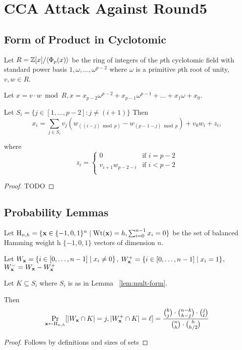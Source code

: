 \section{CCA Attack Against Round5}
\label{sec:cca-attack-against}

\subsection{Form of Product in Cyclotomic}
\label{sec:form-prod-cycl}



\begin{lemma}
\label{lem:mult-form}
Let $R=\mathbb{Z}[x]/\langle\Phi_{p}(x)\rangle$ be the ring of integers of the $p$th cyclotomic field with standard power basis $1,\omega,\ldots,\omega^{p-2}$ where $\omega$ is a primitive $p$th root of unity, $v, w \in R$.

Let $x=v \cdot w \bmod{R}, x=x_{p-2}\omega^{p-2}+x_{p-1}\omega^{p-1}+\ldots+x_{1}\omega+x_{0}$. 

Let $S_{i}=\{j \in [1,\ldots,p-2]: j \neq (i+1)\}$
Then 
\[x_{i}=\sum_{j \in S_{i}}v_{j}\left(w_{((i-j)\bmod{p})}-w_{(p-1-j)\bmod{p}}\right)+v_0w_{i}+z_{i},\]

where 
\[z_i=\begin{cases}0&\text{if }i=p-2\\
v_{i+1}w_{p-2-i}&\text{if }i<p-2\\\end{cases}\]
\end{lemma}

\begin{proof}
TODO
\end{proof}


\subsection{Probability Lemmas}
\label{sec:probability-lemmas}

\begin{lemma}
\label{lem:prob-hits}
Let $\text{H}_{n,h} = \{\mathbf{x} \in \{-1,0,1\}^{n} \mid \text{Wt}(\mathbf{x})=h,\sum_{i=0}^{n-1}x_i=0\}$ be the set of balanced Hamming weight h $\{-1,0,1\}$ vectors of dimension $n$.

Let $W_{\mathbf{x}} = \{i \in [0,\ldots,n-1] \mid x_{i} \neq 0\}$,
$W_{\mathbf{x}}^{+} = \{i \in [0,\ldots,n-1] \mid x_{i} = 1\}$,
$W_{\mathbf{x}}^{-}=W_{\mathbf{x}} - W_{\mathbf{x}}^{+}$ 





Let $K \subseteq S_{i}$ where $S_{i}$ is as in Lemma ~\ref{lem:mult-form}. 


Then \[\Pr_{\mathbf{x} \gets \text{H}_{n,h}}[\lvert W_{\mathbf{x}} \cap K\rvert =
  j,\lvert W_{\mathbf{x}}^{+} \cap K\rvert= \ell]
  =\frac{\binom{k}{j} \cdot \binom{n-k}{h-j} \cdot
    \binom{j}{\ell}}{\binom{n}{h} \cdot \binom{h}{h/2}}\]
\end{lemma}

\begin{proof}
Follows by definitions and sizes of sets 
\end{proof}




